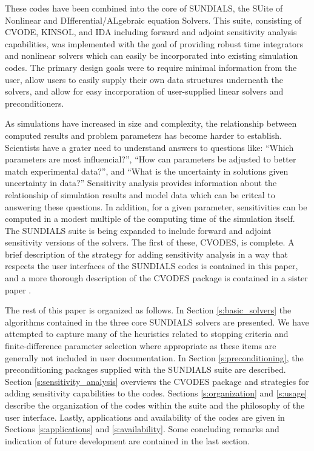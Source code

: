These codes have been combined into the core of SUNDIALS, the  
SUite of Nonlinear and DIfferential/ALgebraic equation Solvers.  
This suite, consisting of CVODE, KINSOL, and IDA including 
forward and adjoint sensitivity 
analysis capabilities, was implemented with the goal of providing
robust time integrators and nonlinear solvers which can easily be 
incorporated into existing simulation codes.  The primary design 
goals were to require minimal information from the user, allow users 
to easily supply their own data structures underneath the solvers, 
and allow for easy incorporation of user-supplied linear solvers
and preconditioners.

As simulations have increased in size and complexity, the 
relationship between computed results and problem parameters has 
become harder to establish.  Scientists have a grater need to
understand answers to questions like: ``Which parameters are 
most influencial?'', ``How can parameters be adjusted to better 
match experimental data?'', and ``What is the uncertainty in solutions 
given uncertainty in data?''  Sensitivity analysis provides 
information about the relationship of simulation results and model data 
 which can be critcal to answering these questions.  In addition, for 
a given parameter, sensitivities can be computed in a modest multiple of 
the computing time of the simulation itself.  
The SUNDIALS suite is being expanded to 
include forward and adjoint sensitivity versions of the solvers.
The first of these, CVODES, is complete.  A brief description of the
strategy for adding sensitivity analysis in a way that respects the
user interfaces of the SUNDIALS codes is contained in this paper, and 
a more thorough description of the CVODES package is contained in a sister 
paper \cite{SeHi:03}.

The rest of this paper is organized as follows.  In Section 
\ref{s:basic_solvers} the algorithms contained in the three 
core SUNDIALS solvers are presented.  
We have attempted to capture many of the heuristics related to 
stopping criteria and finite-difference parameter selection
where appropriate as these items are generally not included in 
user documentation.  In Section \ref{s:preconditioning}, the
preconditioning packages supplied with the SUNDIALS suite are
described.  Section \ref{s:sensitivity_analysis} overviews
the CVODES package and strategies for adding sensitivity 
capabilities to the codes.  Sections \ref{s:organization} and 
\ref{s:usage} describe the organization of the codes within the 
suite and the philosophy of the user interface.  Lastly, 
applications and availability of the codes are given in 
Sections \ref{s:applications} and \ref{s:availability}.  Some
concluding remarks and indication of future development
are contained in the last section.



